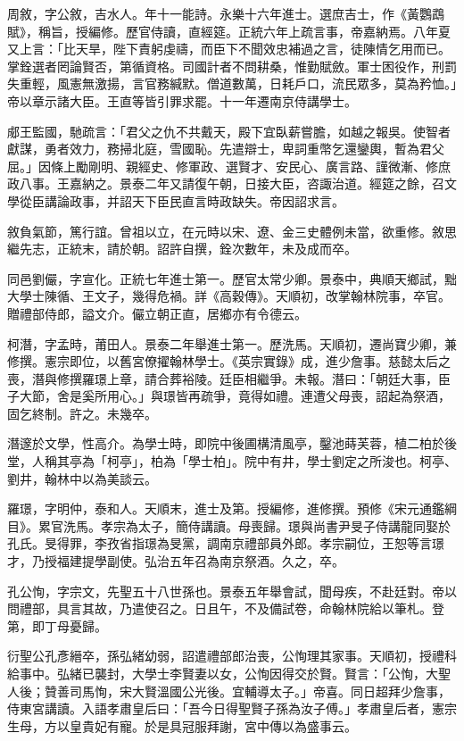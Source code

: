 \begin{pinyinscope}
周敘，字公敘，吉水人。年十一能詩。永樂十六年進士。選庶吉士，作《黃鸚鵡賦》，稱旨，授編修。歷官侍讀，直經筵。正統六年上疏言事，帝嘉納焉。八年夏又上言：「比天旱，陛下責躬虔禱，而臣下不聞效忠補過之言，徒陳情乞用而已。掌銓選者罔論賢否，第循資格。司國計者不問耕桑，惟勤賦斂。軍士困役作，刑罰失重輕，風憲無激揚，言官務緘默。僧道數萬，日耗戶口，流民眾多，莫為矜恤。」帝以章示諸大臣。王直等皆引罪求罷。十一年遷南京侍講學士。

郕王監國，馳疏言：「君父之仇不共戴天，殿下宜臥薪嘗膽，如越之報吳。使智者獻謀，勇者效力，務掃北庭，雪國恥。先遣辯士，卑詞重幣乞還鑾輿，暫為君父屈。」因條上勵剛明、親經史、修軍政、選賢才、安民心、廣言路、謹微漸、修庶政八事。王嘉納之。景泰二年又請復午朝，日接大臣，咨諏治道。經筵之餘，召文學從臣講論政事，并詔天下臣民直言時政缺失。帝因詔求言。

敘負氣節，篤行誼。曾祖以立，在元時以宋、遼、金三史體例未當，欲重修。敘思繼先志，正統末，請於朝。詔許自撰，銓次數年，未及成而卒。

同邑劉儼，字宣化。正統七年進士第一。歷官太常少卿。景泰中，典順天鄉試，黜大學士陳循、王文子，幾得危禍。詳《高穀傳》。天順初，改掌翰林院事，卒官。贈禮部侍郎，謚文介。儼立朝正直，居鄉亦有令德云。

柯潛，字孟時，莆田人。景泰二年舉進士第一。歷洗馬。天順初，遷尚寶少卿，兼修撰。憲宗即位，以舊宮僚擢翰林學士。《英宗實錄》成，進少詹事。慈懿太后之喪，潛與修撰羅璟上章，請合葬裕陵。廷臣相繼爭。未報。潛曰：「朝廷大事，臣子大節，舍是奚所用心。」與璟皆再疏爭，竟得如禮。連遭父母喪，詔起為祭酒，固乞終制。許之。未幾卒。

潛邃於文學，性高介。為學士時，即院中後圃構清風亭，鑿池蒔芙蓉，植二柏於後堂，人稱其亭為「柯亭」，柏為「學士柏」。院中有井，學士劉定之所浚也。柯亭、劉井，翰林中以為美談云。

羅璟，字明仲，泰和人。天順末，進士及第。授編修，進修撰。預修《宋元通鑑綱目》。累官洗馬。孝宗為太子，簡侍講讀。母喪歸。璟與尚書尹旻子侍講龍同娶於孔氏。旻得罪，李孜省指璟為旻黨，調南京禮部員外郎。孝宗嗣位，王恕等言璟才，乃授福建提學副使。弘治五年召為南京祭酒。久之，卒。

孔公恂，字宗文，先聖五十八世孫也。景泰五年舉會試，聞母疾，不赴廷對。帝以問禮部，具言其故，乃遣使召之。日且午，不及備試卷，命翰林院給以筆札。登第，即丁母憂歸。

衍聖公孔彥縉卒，孫弘緒幼弱，詔遣禮部郎治喪，公恂理其家事。天順初，授禮科給事中。弘緒已襲封，大學士李賢妻以女，公恂因得交於賢。賢言：「公恂，大聖人後；贊善司馬恂，宋大賢溫國公光後。宜輔導太子。」帝喜。同日超拜少詹事，侍東宮講讀。入語孝肅皇后曰：「吾今日得聖賢子孫為汝子傅。」孝肅皇后者，憲宗生母，方以皇貴妃有寵。於是具冠服拜謝，宮中傳以為盛事云。


\end{pinyinscope}
